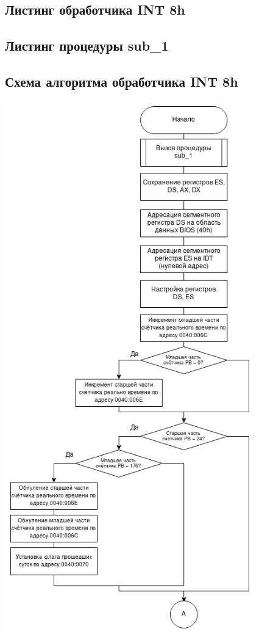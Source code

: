 \documentclass[a4paper,12pt]{article}
\begin{document}


\subsection{Листинг обработчика INT 8h}



\subsection{Листинг процедуры sub\_1}



\pagebreak

\subsection{Схема алгоритма обработчика INT 8h}

\includegraphics[height=230mm]{inc/img/int8h_1}
\end{document}

